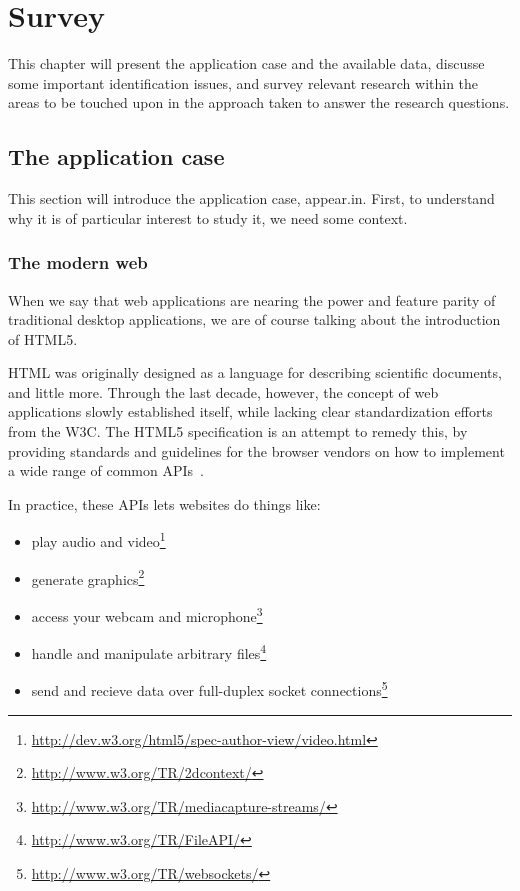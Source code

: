 \chapter{Survey}

\label{Chapter2}


This chapter will present the application case and the available data, discusse some important identification issues, and survey relevant research within the areas to be touched upon in the approach taken to answer the research questions.

\section{The application case}
\label{survey:application_case}

  This section will introduce the application case, appear.in. First, to understand why it is of particular interest to study it, we need some context.

  \subsection{The modern web}
  \label{survey:the_modern_web}

    When we say that web applications are nearing the power and feature parity of traditional desktop applications, we are of course talking about the introduction of HTML5.

    HTML was originally designed as a language for describing scientific documents, and little more. Through the last decade, however, the concept of web applications slowly established itself, while lacking clear standardization efforts from the W3C. The HTML5 specification is an attempt to remedy this, by providing standards and guidelines for the browser vendors on how to implement a wide range of common APIs~\cite{W3CHTML5_intro}.

    In practice, these APIs lets websites do things like:

    \begin{itemize}
        \item play audio and video\footnote{\url{http://dev.w3.org/html5/spec-author-view/video.html}}
        \item generate graphics\footnote{\url{http://www.w3.org/TR/2dcontext/}}
        \item access your webcam and microphone\footnote{\url{http://www.w3.org/TR/mediacapture-streams/}}
        \item handle and manipulate arbitrary files\footnote{\url{http://www.w3.org/TR/FileAPI/}}
        \item send and recieve data over full-duplex socket connections\footnote{\url{http://www.w3.org/TR/websockets/}}
    \end{itemize}

